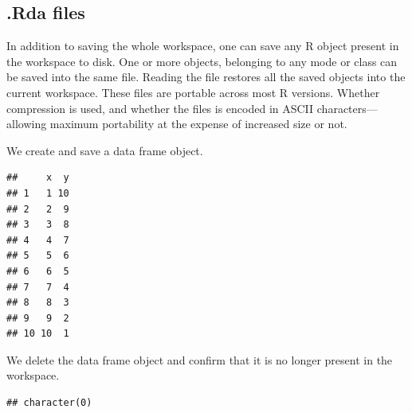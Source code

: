 \documentclass[krantz2,ChapterTOCs]{krantz}\usepackage{knitr}
\begin{document}
\subsection{.Rda files}\label{sec:data:rda}

In addition to saving the whole workspace, one can save any R object present in the workspace to disk. One or more objects, belonging to any mode or class can be saved into the same file. Reading the file restores all the saved objects into the current workspace. These files are portable across most R versions. Whether compression is used, and whether the files is encoded in ASCII characters---allowing maximum portability at the expense of increased size or not.

We create and save a data frame object.

\begin{knitrout}\footnotesize
{}\color{fgcolor}\begin{kframe}
\begin{alltt}
 \hlkwb{<-} \hlstd{(} \hlstd{=} \hlopt{:}\hlstd{,}  \hlstd{=} \hlopt{:}\hlstd{)}
\end{alltt}
\begin{verbatim}
##     x  y
## 1   1 10
## 2   2  9
## 3   3  8
## 4   4  7
## 5   5  6
## 6   6  5
## 7   7  4
## 8   8  3
## 9   9  2
## 10 10  1
\end{verbatim}
\begin{alltt}
  \hlstd{=} \hlstd{)}
\end{alltt}
\end{kframe}
\end{knitrout}

We delete the data frame object and confirm that it is no longer present in the workspace.
\begin{knitrout}\footnotesize
{}\color{fgcolor}\begin{kframe}
\begin{alltt}
\hlstd{(} \hlstd{=} \hlstd{)}
\end{alltt}
\begin{verbatim}
## character(0)
\end{verbatim}
\end{kframe}
\end{knitrout}
\end{document}
